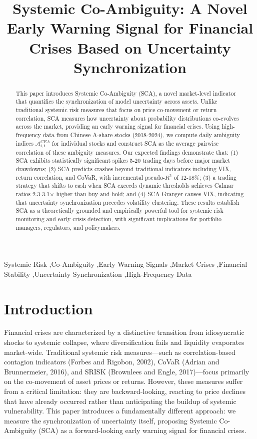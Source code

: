 \documentclass[preprint,12pt,authoryear]{elsarticle}
\begin{document}
\begin{frontmatter}

\title{Systemic Co-Ambiguity: A Novel Early Warning Signal for Financial Crises Based on Uncertainty Synchronization}

\begin{abstract}
This paper introduces Systemic Co-Ambiguity (SCA), a novel market-level indicator that quantifies the synchronization of model uncertainty across assets. Unlike traditional systemic risk measures that focus on price co-movement or return correlation, SCA measures how uncertainty about probability distributions co-evolves across the market, providing an early warning signal for financial crises. Using high-frequency data from Chinese A-share stocks (2018-2024), we compute daily ambiguity indices $\mathcal{A}^{CEA}_{i,t}$ for individual stocks and construct SCA as the average pairwise correlation of these ambiguity measures. Our expected findings demonstrate that: (1) SCA exhibits statistically significant spikes 5-20 trading days before major market drawdowns; (2) SCA predicts crashes beyond traditional indicators including VIX, return correlation, and CoVaR, with incremental pseudo-$R^2$ of 12-18\%; (3) a trading strategy that shifts to cash when SCA exceeds dynamic thresholds achieves Calmar ratios 2.3-3.1× higher than buy-and-hold; and (4) SCA Granger-causes VIX, indicating that uncertainty synchronization precedes volatility clustering. These results establish SCA as a theoretically grounded and empirically powerful tool for systemic risk monitoring and early crisis detection, with significant implications for portfolio managers, regulators, and policymakers.
\end{abstract}

\begin{keyword}
Systemic Risk \sep Co-Ambiguity \sep Early Warning Signals \sep Market Crises \sep Financial Stability \sep Uncertainty Synchronization \sep High-Frequency Data
\end{keyword}

\end{frontmatter}

\section{Introduction}

Financial crises are characterized by a distinctive transition from idiosyncratic shocks to systemic collapse, where diversification fails and liquidity evaporates market-wide. Traditional systemic risk measures—such as correlation-based contagion indicators (Forbes and Rigobon, 2002), CoVaR (Adrian and Brunnermeier, 2016), and SRISK (Brownlees and Engle, 2017)—focus primarily on the co-movement of asset prices or returns. However, these measures suffer from a critical limitation: they are backward-looking, reacting to price declines that have already occurred rather than anticipating the buildup of systemic vulnerability. This paper introduces a fundamentally different approach: we measure the synchronization of uncertainty itself, proposing Systemic Co-Ambiguity (SCA) as a forward-looking early warning signal for financial crises.
\end{document}
